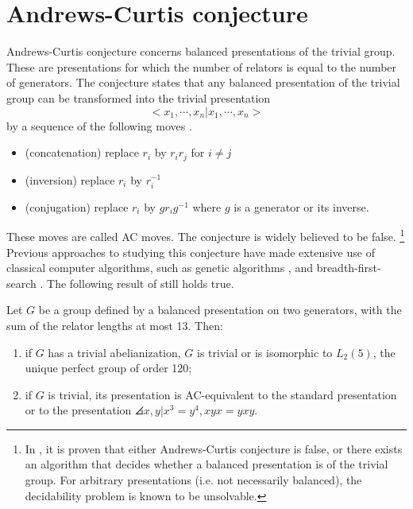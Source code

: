 
\section{Andrews-Curtis conjecture\label{sec:AC}}

Andrews-Curtis conjecture concerns balanced presentations
of the trivial group.
These are presentations for which the number of relators is
equal to the number of generators.
The conjecture states that any balanced presentation of
the trivial group can be transformed into the trivial presentation $$<x_1, \cdots, x_n | x_1, \cdots, x_n >$$ by
a sequence of the following moves \cite{Andrews-Curtis}.

\begin{itemize}
	\item (concatenation) replace $r_i$ by $r_i r_j$ for $i \neq j$
	\item (inversion) replace $r_i$ by $r_i^{-1}$
	\item (conjugation) replace $r_i$ by $g r_i g^{-1}$ where $g$ is a generator or its inverse.
\end{itemize}

These moves are called AC moves.
The conjecture is widely believed to be false.
\footnote{In \cite{decidability}, it is proven that either Andrews-Curtis conjecture is false, or there exists an algorithm that decides whether a balanced presentation is of the trivial group.
For arbitrary presentations (i.e. not necessarily balanced), the decidability problem is known to be unsolvable.
}
Previous approaches to studying this conjecture have made extensive use of classical computer algorithms, such as genetic algorithms \cite{genetic}, and breadth-first-search  \cite{bfs-ac}.
The following result of \cite{bfs-ac} still holds true.

\begin{theorem}
	Let $G$ be a group defined by a balanced presentation on two generators, with the sum
	of the relator lengths at most 13.
	Then:
	\begin{enumerate}[label=(\roman*)]
		\item if $G$ has a trivial abelianization, $G$ is trivial or is isomorphic to $L_2(5)$, the unique perfect
		group of order 120;
		\item if $G$ is trivial, its presentation is AC-equivalent to the standard presentation or to the presentation
		$\angles{x, y | x^3 = y^4, xyx = yxy}$.
	\end{enumerate}
\end{theorem}

